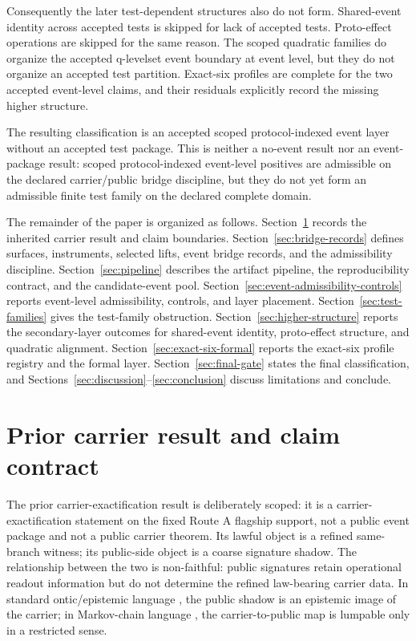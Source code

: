 \documentclass[11pt]{article}
\theoremstyle{definition}
\begin{document}
Consequently the later test-dependent structures also do not form. Shared-event identity across accepted tests is skipped for lack of accepted tests. Proto-effect operations are skipped for the same reason. The scoped quadratic families do organize the accepted q-levelset event boundary at event level, but they do not organize an accepted test partition. Exact-six profiles are complete for the two accepted event-level claims, and their residuals explicitly record the missing higher structure.

The resulting classification is an accepted scoped protocol-indexed event layer without an accepted test package. This is neither a no-event result nor an event-package result: scoped protocol-indexed event-level positives are admissible on the declared carrier/public bridge discipline, but they do not yet form an admissible finite test family on the declared complete domain.

The remainder of the paper is organized as follows. Section~\ref{sec:prior-contract} records the inherited carrier result and claim boundaries. Section~\ref{sec:bridge-records} defines surfaces, instruments, selected lifts, event bridge records, and the admissibility discipline. Section~\ref{sec:pipeline} describes the artifact pipeline, the reproducibility contract, and the candidate-event pool. Section~\ref{sec:event-admissibility-controls} reports event-level admissibility, controls, and layer placement. Section~\ref{sec:test-families} gives the test-family obstruction. Section~\ref{sec:higher-structure} reports the secondary-layer outcomes for shared-event identity, proto-effect structure, and quadratic alignment. Section~\ref{sec:exact-six-formal} reports the exact-six profile registry and the formal layer. Section~\ref{sec:final-gate} states the final classification, and Sections~\ref{sec:discussion}--\ref{sec:conclusion} discuss limitations and conclude.
 \section{Prior carrier result and claim contract}
\label{sec:prior-contract}

The prior carrier-exactification result \citep{Tsiokos2026CarrierExactification} is deliberately scoped: it is a carrier-exactification statement on the fixed Route A flagship support, not a public event package and not a public carrier theorem. Its lawful object is a refined same-branch witness; its public-side object is a coarse signature shadow. The relationship between the two is non-faithful: public signatures retain operational readout information but do not determine the refined law-bearing carrier data. In standard ontic/epistemic language \citep{HarriganSpekkens2010,Pusey2012PBR}, the public shadow is an epistemic image of the carrier; in Markov-chain language \citep{KemenySnell1976}, the carrier-to-public map is lumpable only in a restricted sense.
\end{document}
